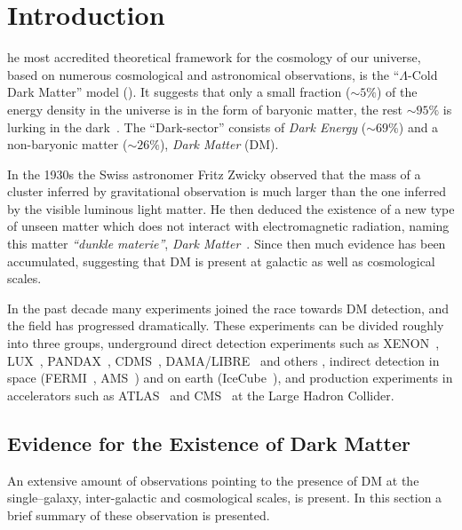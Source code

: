 %
%
\let\textcircled=\pgftextcircled
\chapter{Introduction}
\label{chap:intro}

he most accredited theoretical framework for the cosmology of our universe, based on numerous cosmological and astronomical observations, is the ``$\Lambda$-Cold Dark Matter'' model (\cdm). It suggests that only a small fraction ($\sim 5\%$) of the energy density in the universe is in the form of baryonic matter, the rest  $\sim 95\%$ is lurking in the dark~\cite{WMAP:9years, Planck}. The ``Dark-sector'' consists of \textit{Dark Energy} ($\sim 69\%$) and a non-baryonic matter ($\sim 26\%$), \textit{Dark Matter} (DM).

In the 1930s the Swiss astronomer Fritz Zwicky observed that the mass of a cluster inferred by gravitational observation is much larger than the one inferred by the visible luminous light matter. He then deduced the existence of a new type of unseen matter which does not interact with electromagnetic radiation, naming this matter \textit{``dunkle materie''}, \textit{Dark Matter}~\cite{Zwicky:1937zza}. Since then much evidence has been accumulated, suggesting that DM is present at galactic as well as cosmological scales.

In the past decade many experiments joined the race towards DM detection, and the field has progressed dramatically. These experiments can be divided
roughly into three groups, underground direct detection experiments such as XENON~\cite{xe100_run_combination,Xenon1TResults}, LUX~\cite{LUXnew}, PANDAX~\cite{PANDAX}, CDMS~\cite{CDMSlite}, DAMA/LIBRE~\cite{DAMA} and others , indirect detection in space (FERMI~\cite{FermiLAT:2011ab}, AMS~\cite{AMS}) and on earth (IceCube~\cite{IceCube}), and production experiments in accelerators such as ATLAS~\cite{AtlasDM} and CMS~\cite{CmsDM} at the Large Hadron Collider.

\section{Evidence for the Existence of Dark Matter}
\label{sec:Evidence}
An extensive amount of observations pointing to the presence of DM at the  single--galaxy, inter-galactic and cosmological scales, is present. In this section a brief summary of these observation is presented. 

